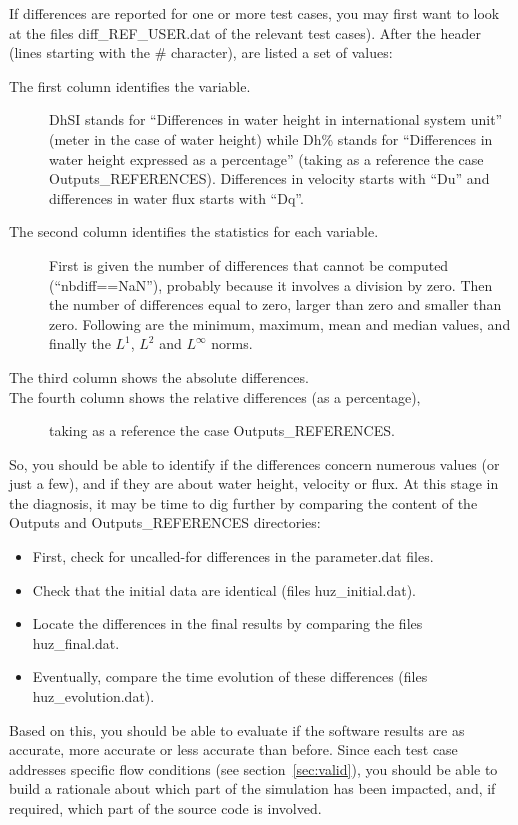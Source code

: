 \documentclass[a4paper, 11pt]{article}
\begin{document}
If differences are reported for one or more test cases, you may first want to look at the files diff\_REF\_USER.dat of the relevant test cases). After the header (lines starting with the \# character), are listed a set of values:
\begin{description}
\item[The first column identifies the variable.] DhSI stands for ``Differences in water height in international system unit'' (meter in the case of water height) while Dh\% stands for ``Differences in water height expressed as a percentage'' (taking as a reference the case Outputs\_REFERENCES). Differences in velocity starts with ``Du'' and differences in water flux starts with ``Dq''.
\item[The second column identifies the statistics for each variable.] First is given the number of differences that cannot be computed (``nbdiff==NaN''), probably because it involves a division by zero. Then the number of differences equal to zero, larger than zero and smaller than zero. Following are the minimum, maximum, mean and median values, and finally the $L^1$, $L^2$ and $L^\infty$ norms.
\item[The third column shows the absolute differences.] 
\item[The fourth column shows the relative differences (as a percentage),] taking as a reference the case Outputs\_REFERENCES.
\end{description}
So, you should be able to identify if the differences concern numerous values (or just a few), and if they are about water height, velocity or flux. At this stage in the diagnosis, it may be time to dig further by comparing the content of the Outputs and Outputs\_REFERENCES directories:
\begin{itemize}
\item First, check for uncalled-for differences in the parameter.dat files. 
\item Check that the initial data are identical (files huz\_initial.dat).
\item Locate the differences in the final results by comparing the files huz\_final.dat.
\item Eventually, compare the time evolution of these differences (files huz\_evolution.dat).
\end{itemize}
Based on this, you should be able to evaluate if the software results are as accurate, more accurate or less accurate than before. Since each test case addresses specific flow conditions (see section~\ref{sec:valid}), you should be able to build a rationale about which part of the simulation has been impacted, and, if required, which part of the source code is involved.
\fussy
\end{document}
